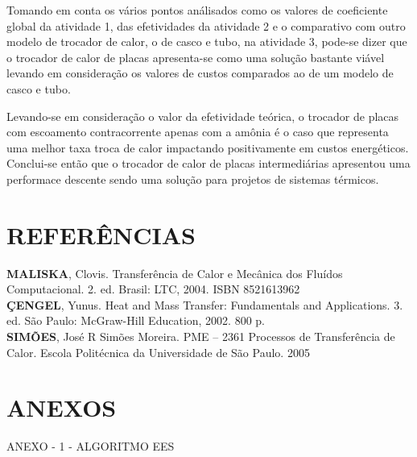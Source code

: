 \documentclass[a4paper,12pt,oneside]{article}
\begin{document}
\begin{flushright}
Tomando em conta os vários pontos análisados como os valores de coeficiente global da atividade 1, das efetividades da atividade 2 e o comparativo com outro modelo de trocador de calor, o de casco e tubo, na atividade 3, pode-se dizer que o trocador de calor de placas apresenta-se como uma solução bastante viável levando em consideração os valores de custos comparados ao de um modelo de casco e tubo.

Levando-se em consideração o valor da efetividade teórica, o trocador de placas com escoamento contracorrente apenas com a amônia é o caso que representa uma melhor taxa troca de calor impactando positivamente em custos energéticos. Conclui-se então que o trocador de calor de placas intermediárias apresentou uma performace descente sendo uma solução para projetos de sistemas térmicos.

\pagebreak
\clearpage
\newpage

\section*{\large REFERÊNCIAS}
\vspace{0.5cm}

\textbf{MALISKA}, Clovis. Transferência de Calor e Mecânica dos Fluídos
Computacional. 2. ed. Brasil: LTC, 2004. ISBN 8521613962\\

\textbf{ÇENGEL}, Yunus. Heat and Mass Transfer: Fundamentals and Applications. 3. ed. São Paulo: McGraw-Hill Education, 2002. 800 p.\\

\textbf{SIMÕES}, José R Simões Moreira. PME – 2361 Processos de Transferência de Calor. Escola Politécnica da Universidade de São Paulo. 2005\\
\pagebreak
\clearpage
\newpage

\section*{\large ANEXOS}
\vspace{0.5cm}

\large ANEXO - 1 - ALGORITMO EES
\vspace{0.5cm}



\end{flushright}
\end{document}

